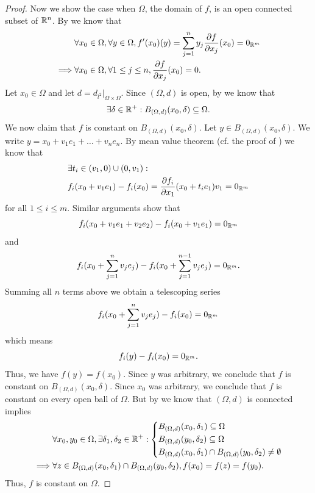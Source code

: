 \begin{proof}
  Now we show the case when \(\Omega\), the domain of \(f\), is an open connected subset of \(\mathbb{R}^n\).
  By  we know that
  \begin{align*}
             & \forall x_0 \in \Omega, \forall y \in \Omega, f'(x_0)(y) = \sum_{j = 1}^n y_j \dfrac{\partial f}{\partial x_j}(x_0) = 0_{\mathbb{R}^m} \\
    \implies & \forall x_0 \in \Omega, \forall 1 \leq j \leq n, \dfrac{\partial f}{\partial x_j}(x_0) = 0.
  \end{align*}
  Let \(x_0 \in \Omega\) and let \(d = d_{l^2}|_{\Omega \times \Omega}\).
  Since \((\Omega, d)\) is open, by  we know that
  \[
    \exists \delta \in \mathbb{R}^+ : B_{(\Omega, d)}(x_0, \delta) \subseteq \Omega.
  \]
  We now claim that \(f\) is constant on \(B_{(\Omega, d)}(x_0, \delta)\).
  Let \(y \in B_{(\Omega, d)}(x_0, \delta)\).
  We write \(y = x_0 + v_1 e_1 + \dots + v_n e_n\).
  By mean value theorem (cf. the proof of ) we know that
  \begin{align*}
     & \exists t_i \in (v_1, 0) \cup (0, v_1) :                                                         \\
     & f_i(x_0 + v_1 e_1) - f_i(x_0) = \dfrac{\partial f_i}{\partial x_1}(x_0 + t_i e_1) v_1 = 0_{\mathbb{R}^m}
  \end{align*}
  for all \(1 \leq i \leq m\).
  Similar arguments show that
  \[
    f_i(x_0 + v_1 e_1 + v_2 e_2) - f_i(x_0 + v_1 e_1) = 0_{\mathbb{R}^m}
  \]
  and
  \[
    f_i(x_0 + \sum_{j = 1}^n v_j e_j) - f_i(x_0 + \sum_{j = 1}^{n - 1} v_j e_j) = 0_{\mathbb{R}^m}.
  \]
  Summing all \(n\) terms above we obtain a telescoping series
  \[
    f_i(x_0 + \sum_{j = 1}^n v_j e_j) - f_i(x_0) = 0_{\mathbb{R}^m}
  \]
  which means
  \[
    f_i(y) - f_i(x_0) = 0_{\mathbb{R}^m}.
  \]
  Thus, we have \(f(y) = f(x_0)\).
  Since \(y\) was arbitrary, we conclude that \(f\) is constant on \(B_{(\Omega, d)}(x_0, \delta)\).
  Since \(x_0\) was arbitrary, we conclude that \(f\) is constant on every open ball of \(\Omega\).
  But by  we know that \((\Omega, d)\) is connected implies
  \begin{align*}
             & \forall x_0, y_0 \in \Omega, \exists \delta_1, \delta_2 \in \mathbb{R}^+ : \begin{dcases}
                                                                                    B_{(\Omega, d)}(x_0, \delta_1) \subseteq \Omega \\
                                                                                    B_{(\Omega, d)}(y_0, \delta_2) \subseteq \Omega \\
                                                                                    B_{(\Omega, d)}(x_0, \delta_1) \cap B_{(\Omega, d)}(y_0, \delta_2) \neq \emptyset
                                                                                  \end{dcases} \\
    \implies & \forall z \in B_{(\Omega, d)}(x_0, \delta_1) \cap B_{(\Omega, d)}(y_0, \delta_2), f(x_0) = f(z) = f(y_0).
  \end{align*}
  Thus, \(f\) is constant on \(\Omega\).
\end{proof}
